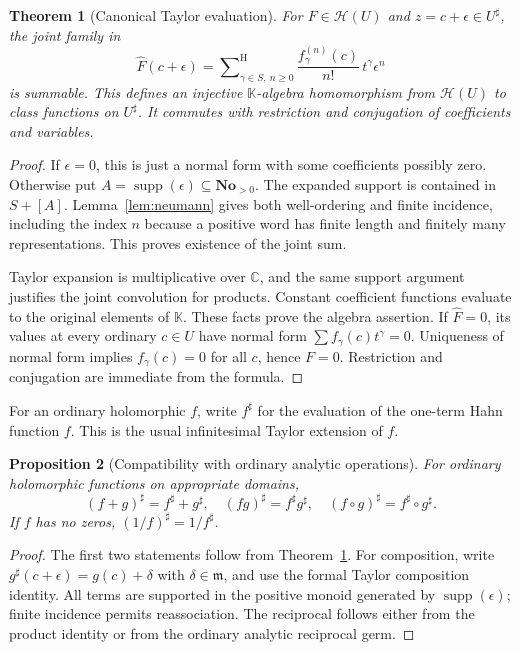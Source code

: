 \documentclass[11pt,oneside]{article}
\newtheorem{theorem}{Theorem}[section]
\newtheorem{proposition}[theorem]{Proposition}
\theoremstyle{definition}\newtheorem{definition}[theorem]{Definition}
\newcommand{\No}{\mathbf{No}}
\newcommand{\K}{\mathbb K}
\newcommand{\C}{\mathbb C}
\newcommand{\HH}{\mathcal H}
\newcommand{\mm}{\mathfrak m}
\newcommand{\supp}{\operatorname{supp}}
\newcommand{\Hsum}{\mathop{\sum}\nolimits^{\mathrm H}}
\newcommand{\hatF}{\widehat F}
\begin{document}
\begin{theorem}[Canonical Taylor evaluation]\label{thm:evaluation}
For $F\in\HH(U)$ and $z=c+\epsilon\in U^\sharp$, the joint family in
\begin{equation}\label{eq:evaluation}
 \widehat F(c+\epsilon)
 =\Hsum_{\gamma\in S,\ n\geq0}
   \frac{f_\gamma^{(n)}(c)}{n!}\,t^\gamma\epsilon^n
\end{equation}
is summable. This defines an injective $\K$-algebra homomorphism from $\HH(U)$ to class functions on $U^\sharp$. It commutes with restriction and conjugation of coefficients and variables.
\end{theorem}
\begin{proof}
If $\epsilon=0$, this is just a normal form with some coefficients possibly zero. Otherwise put $A=\supp(\epsilon)\subseteq\No_{>0}$. The expanded support is contained in $S+[A]$. Lemma~\ref{lem:neumann} gives both well-ordering and finite incidence, including the index $n$ because a positive word has finite length and finitely many representations. This proves existence of the joint sum.

Taylor expansion is multiplicative over $\C$, and the same support argument justifies the joint convolution for products. Constant coefficient functions evaluate to the original elements of $\K$. These facts prove the algebra assertion. If $\hatF=0$, its values at every ordinary $c\in U$ have normal form $\sum f_\gamma(c)t^\gamma=0$. Uniqueness of normal form implies $f_\gamma(c)=0$ for all $c$, hence $F=0$. Restriction and conjugation are immediate from the formula.
\end{proof}
For an ordinary holomorphic $f$, write $f^\sharp$ for the evaluation of the one-term Hahn function $f$. This is the usual infinitesimal Taylor extension of $f$.

\begin{proposition}[Compatibility with ordinary analytic operations]\label{prop:lift}
For ordinary holomorphic functions on appropriate domains,
\[
 (f+g)^\sharp=f^\sharp+g^\sharp,\quad
 (fg)^\sharp=f^\sharp g^\sharp,\quad
 (f\circ g)^\sharp=f^\sharp\circ g^\sharp.
\]
If $f$ has no zeros, $(1/f)^\sharp=1/f^\sharp$.
\end{proposition}
\begin{proof}
The first two statements follow from Theorem~\ref{thm:evaluation}. For composition, write $g^\sharp(c+\epsilon)=g(c)+\delta$ with $\delta\in\mm$, and use the formal Taylor composition identity. All terms are supported in the positive monoid generated by $\supp(\epsilon)$; finite incidence permits reassociation. The reciprocal follows either from the product identity or from the ordinary analytic reciprocal germ.
\end{proof}
\end{document}
